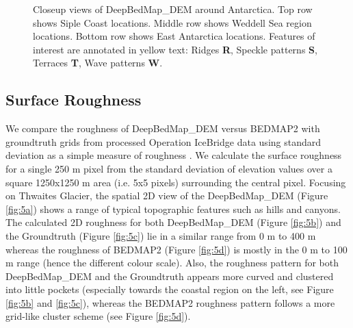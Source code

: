 \documentclass[tc, manuscript]{copernicus}
\begin{document}
\begin{figure*}[htbp]
  \centering
  \qquad
  \qquad
  \caption{
    Closeup views of DeepBedMap\_DEM around Antarctica.
    Top row shows Siple Coast locations.
    Middle row shows Weddell Sea region locations.
    Bottom row shows East Antarctica locations.
    Features of interest are annotated in yellow text:
    Ridges \textbf{R}, Speckle patterns \textbf{S}, Terraces \textbf{T}, Wave patterns \textbf{W}.
  }
  \label{fig:4}
\end{figure*}

\subsection{Surface Roughness} \label{section:surfaceroughness}

We compare the roughness of DeepBedMap\_DEM versus BEDMAP2 with groundtruth grids from processed Operation IceBridge data \citep{ShiMultichannelCoherentRadar2010} using standard deviation as a simple measure of roughness \citep{RippinBasalroughnessInstitute2014}.
We calculate the surface roughness for a single 250 m pixel from the standard deviation of elevation values over a square 1250x1250 m area (i.e. 5x5 pixels) surrounding the central pixel.
Focusing on Thwaites Glacier, the spatial 2D view of the DeepBedMap\_DEM (Figure \ref{fig:5a}) shows a range of typical topographic features such as hills and canyons.
The calculated 2D roughness for both DeepBedMap\_DEM (Figure \ref{fig:5b}) and the Groundtruth (Figure \ref{fig:5c}) lie in a similar range from 0 m to 400 m whereas the roughness of BEDMAP2 (Figure \ref{fig:5d}) is mostly in the 0 m to 100 m range (hence the different colour scale).
Also, the roughness pattern for both DeepBedMap\_DEM and the Groundtruth appears more curved and clustered into little pockets (especially towards the coastal region on the left, see Figure \ref{fig:5b} and \ref{fig:5c}), whereas the BEDMAP2 roughness pattern follows a more grid-like cluster scheme (see Figure \ref{fig:5d}).
\end{document}
